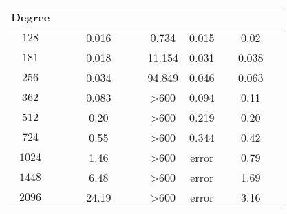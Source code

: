 \begin{table}
	\centering
	\label{tab:and}
	\begin{tabular}{|| c| c| c| c| c ||}
		\hline
		
		\hline
		\scriptsize{Degree}  &\ \  \ \ \ \ \scriptsize{\froot}\ \  \ \  \ \   & \scriptsize{\REALROOT} &\scriptsize{\inte}  &\ \   \ \    \scriptsize{\AND}\ \ \ \   \\
		\hline
		$128$ & 0.016 & 0.734 &  0.015 &  0.02\\
		\hline
		$181$ & 0.018 & 11.154 & 0.031 & 0.038\\
		\hline
		$256$ & 0.034 & 94.849&  0.046  & 0.063\\
		\hline
		$362$ & 0.083 & >600&  0.094 & 0.11\\
		\hline
		$512$ & 0.20 &  >600 & 0.219 & 0.20  \\
		
		\hline
		$724$ & 0.55 &  >600&  0.344 & 0.42 \\
		
		\hline
		$1024$ & 1.46 & >600 & error & 0.79 \\
		
		\hline
		$1448$ & 6.48 &  >600&  error &  1.69 \\
		\hline
		$2096$ & 24.19 &  >600&  error & 3.16 \\	
		\hline
		
		\hline
	\end{tabular}%
\end{table}





